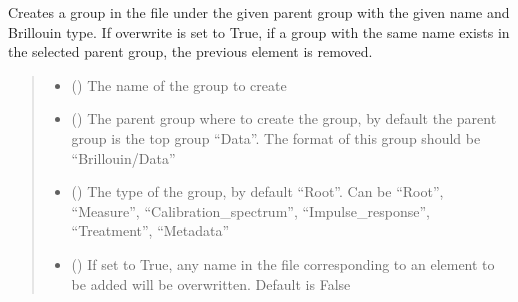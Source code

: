 \documentclass[letterpaper,10pt,english]{sphinxmanual}
\begin{document}
\begin{fulllineitems}
\begin{fulllineitems}
\label{\detokenize{source/_autosummary/HDF5_BLS.Wrapper:HDF5_BLS.Wrapper.create_group}}
\pysigstartsignatures
\pysiglinewithargsret
{}
{\sphinxparamcomma {}\sphinxparamcomma {}\sphinxparamcomma {}}
{}
\pysigstopsignatures
\sphinxAtStartPar
Creates a group in the file under the given parent group with the given name and Brillouin type. If overwrite is set to True, if a group with the same name exists in the selected parent group, the previous element is removed.
\begin{quote}\begin{description}
\begin{itemize}
\item {} 
\sphinxAtStartPar
{} () \textendash{} The name of the group to create

\item {} 
\sphinxAtStartPar
{} (\sphinxstyleliteralemphasis{\sphinxupquote{, }}) \textendash{} The parent group where to create the group, by default the parent group is the top group “Data”. The format of this group should be “Brillouin/Data”

\item {} 
\sphinxAtStartPar
{} (\sphinxstyleliteralemphasis{\sphinxupquote{, }}) \textendash{} The type of the group, by default “Root”. Can be “Root”, “Measure”, “Calibration\_spectrum”, “Impulse\_response”, “Treatment”, “Metadata”

\item {} 
\sphinxAtStartPar
{} (\sphinxstyleliteralemphasis{\sphinxupquote{, }}) \textendash{} If set to True, any name in the file corresponding to an element to be added will be overwritten. Default is False


\end{itemize}
\end{description}
\end{quote}
\end{fulllineitems}
\end{fulllineitems}
\end{document}
